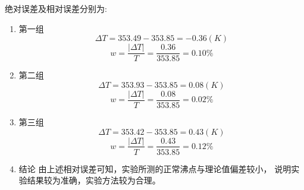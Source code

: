 \documentclass[11pt]{report}
\begin{document}
\begin{enumerate}
\begin{enumerate}
绝对误差及相对误差分别为:
\begin{enumerate}
\item 第一组
\label{sec:orge79bf48}
\[
      \Delta T=353.49-353.85=-0.36(K)
      \]
\[
      w=\frac{|\Delta T|}{T}=\frac{0.36}{353.85}=0.10\%
      \]
\item 第二组
\label{sec:org5a92db1}
\[
      \Delta T=353.93-353.85=0.08(K)
      \]
\[
      w=\frac{|\Delta T|}{T}=\frac{0.08}{353.85}=0.02\%
      \]
\item 第三组
\label{sec:orgab98356}
\[
      \Delta T=353.42-353.85=0.43(K)
      \]
\[
      w=\frac{|\Delta T|}{T}=\frac{0.43}{353.85}=0.12\%
      \]
\item 结论
\label{sec:orgea64bf2}
由上述相对误差可知，实验所测的正常沸点与理论值偏差较小，
说明实验结果较为准确，实验方法较为合理。
\end{enumerate}
\end{enumerate}
\end{enumerate}
\end{document}
